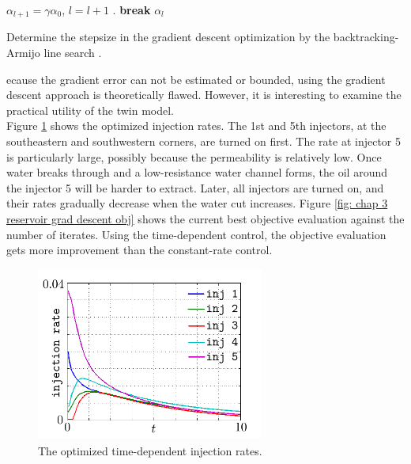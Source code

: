 \begin{algorithm}[htbp]
\begin{algorithmic}[1]
        \STATE $\alpha_{l+1} = \gamma \alpha_0$, $l=l+1$ .
            \STATE \textbf{break}
        \ENDIF
    \ENDFOR
\ENSURE $\alpha_{l}$
\end{algorithmic}
\caption{Determine the stepsize in the gradient descent optimization by 
         the backtracking-Armijo line search \cite{backtrack line search}.}
\label{alg: Armijo}
\end{algorithm}

ecause the gradient error
can not be estimated or bounded, using the gradient descent approach is theoretically flawed.
However, it is interesting to examine the practical utility of the twin model.\\

Figure \ref{fig: chap 3 reservoir opt inj} shows the optimized injection rates.
The 1st and 5th injectors, at the southeastern and southwestern corners, are turned on first.
The rate at injector 5 is particularly large, possibly because the permeability is relatively low.
Once water breaks through and a low-resistance water channel forms, the oil around the 
injector 5 will be 
harder to extract. Later, all injectors are turned on, and their rates gradually decrease
when the water cut increases. Figure \ref{fig: chap 3 reservoir grad descent obj} shows the
current best objective evaluation against the number of iterates. Using the 
time-dependent control, the objective 
evaluation gets more improvement than the constant-rate control.


\begin{figure}[htbp]\begin{center}
    \includegraphics[width=7.5cm,height=5.7cm]{../optinj.png}
    \caption{The optimized time-dependent injection rates.}
    \label{fig: chap 3 reservoir opt inj}
\end{center}\end{figure}


